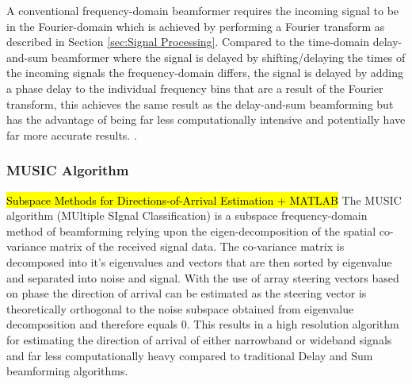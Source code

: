 \documentclass{UoNMCHA}
\numberwithin{equation}{section}
\begin{document}
    A conventional frequency-domain beamformer requires the incoming signal to be in the Fourier-domain which is achieved by performing a Fourier transform as described in Section \ref{sec:Signal Processing}. Compared to the time-domain delay-and-sum beamformer where the signal is delayed by shifting/delaying the times of the incoming signals the frequency-domain differs, the signal is delayed by adding a phase delay to the individual frequency bins that are a result of the Fourier transform, this achieves the same result as the delay-and-sum beamforming but has the advantage of being far less computationally intensive and potentially have far more accurate results. \citep{Kri13}.
\subsubsection{MUSIC Algorithm} \label{sec:Intro MUSIC}
    \hl{Subspace Methods for Directions-of-Arrival Estimation + MATLAB} The MUSIC algorithm (MUltiple SIgnal Classification) is a subspace frequency-domain method of beamforming relying upon the eigen-decomposition of the spatial co-variance matrix of the received signal data. The co-variance matrix is decomposed into it's eigenvalues and vectors that are then sorted by eigenvalue and separated into noise and signal.
    With the use of array steering vectors based on phase the direction of arrival can be estimated as the steering vector is theoretically orthogonal to the noise subspace obtained from eigenvalue decomposition and therefore equals 0. This results in a high resolution algorithm for estimating the direction of arrival of either narrowband or wideband signals and far less computationally heavy compared to traditional Delay and Sum beamforming algorithms.
    
\end{document}
